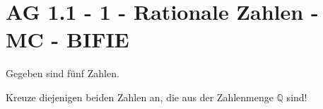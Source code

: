 \section{AG 1.1 - 1 - Rationale Zahlen - MC - BIFIE}

\begin{beispiel}[AG 1.1]{1} %
				Gegeben sind fünf Zahlen.
				
				Kreuze diejenigen beiden Zahlen an, die aus der Zahlenmenge $\mathbb{Q}$ sind!
\end{beispiel}
